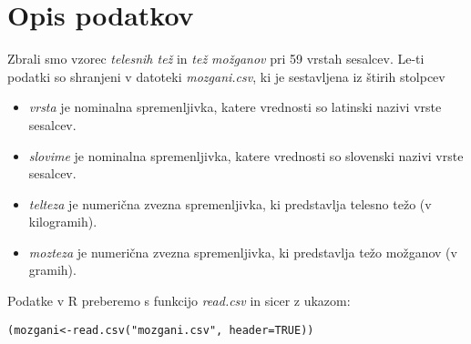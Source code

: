 \section{Opis podatkov}

Zbrali smo vzorec \emph{telesnih tež} in \emph{tež možganov} pri 59 vrstah sesalcev.
Le-ti podatki so shranjeni v datoteki \emph{mozgani.csv}, ki je sestavljena iz štirih stolpcev

\begin{itemize}
    \item \emph{vrsta} je nominalna spremenljivka, katere vrednosti so latinski nazivi vrste sesalcev.
    \item \emph{slovime} je nominalna spremenljivka, katere vrednosti so slovenski nazivi vrste sesalcev.
    \item \emph{telteza} je numerična zvezna spremenljivka, ki predstavlja telesno težo (v kilogramih).
    \item \emph{mozteza} je numerična zvezna spremenljivka, ki predstavlja težo možganov (v gramih).
\end{itemize}

\noindent
Podatke v R preberemo s funkcijo \emph{read.csv} in sicer z ukazom:

\noindent
\verb|(mozgani<-read.csv("mozgani.csv", header=TRUE))|
